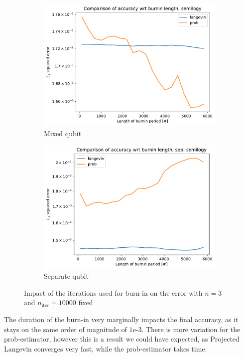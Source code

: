 \documentclass[12pt]{memoir}
\newcommand{\nitern}[1]{$n_{\text{iter}}=#1$}
\begin{document}
\begin{figure}[H]
    \centering
    \begin{subfigure}[b]{0.49\textwidth}
        \centering
        \includegraphics[width=\textwidth]{figures/experiments/burnin/burnin_acc_comp_burnin-1.png}
        \caption{Mixed qubit}
        \label{fig:burnin-comp-mixed-DG-sub}
    \end{subfigure}
    \hfill
    \begin{subfigure}[b]{0.49\textwidth}
        \centering
        \includegraphics[width=\textwidth]{figures/experiments/burnin/burnin_acc_comp_burnin_sep-1.png}
        \caption{Separate qubit}
        \label{fig:burnin-comp-sep-DG-sub}
    \end{subfigure}
    \caption{Impact of the iterations used for burn-in on the error with $n=3$ and \nitern{10000} fixed}
    \label{fig:burnin-comp}
\end{figure}
The duration of the burn-in very marginally impacts the final accuracy, as it stays on the same order of magnitude of $1\text{e-}3$. There is more variation for the prob-estimator, however this is a result we could have expected, as Projected Langevin converges very fast, while the prob-estimator takes time.
\end{document}

